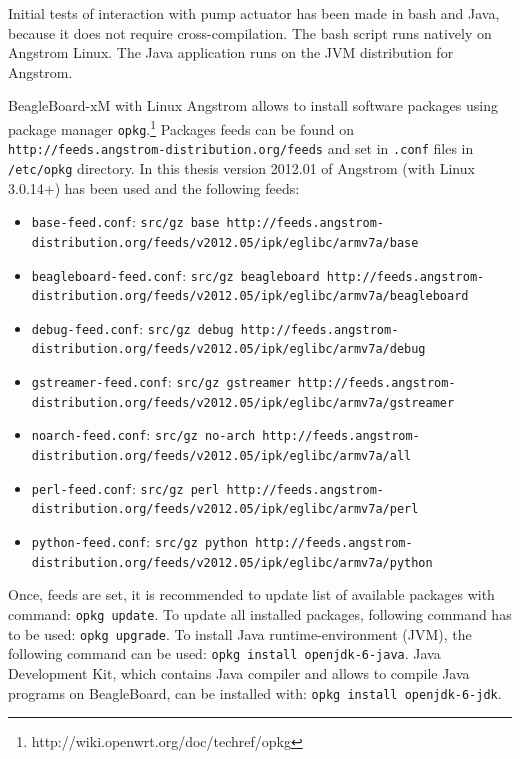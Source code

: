 Initial tests of interaction with pump actuator has been made in bash and Java, because it does not require cross-compilation. The bash script runs natively on Angstrom Linux. The Java application runs on the JVM distribution for Angstrom. 

\clearpage

BeagleBoard-xM with Linux Angstrom allows to install software packages using package manager \lstinline{opkg}.\footnote{http://wiki.openwrt.org/doc/techref/opkg} Packages feeds can be found on \lstinline{http://feeds.angstrom-distribution.org/feeds} and set in \lstinline{.conf} files in \lstinline{/etc/opkg} directory. In this thesis version 2012.01 of Angstrom (with Linux 3.0.14+) has been used and the following feeds:
\begin{itemize} \itemsep0pt \parskip0pt 
	\item \lstinline{base-feed.conf}: \lstinline{src/gz base http://feeds.angstrom-distribution.org/feeds/v2012.05/ipk/eglibc/armv7a/base}
	\item \lstinline{beagleboard-feed.conf}: \lstinline{src/gz beagleboard http://feeds.angstrom-distribution.org/feeds/v2012.05/ipk/eglibc/armv7a/beagleboard}
	\item \lstinline{debug-feed.conf}: \lstinline{src/gz debug http://feeds.angstrom-distribution.org/feeds/v2012.05/ipk/eglibc/armv7a/debug}
	\item \lstinline{gstreamer-feed.conf}: \lstinline{src/gz gstreamer http://feeds.angstrom-distribution.org/feeds/v2012.05/ipk/eglibc/armv7a/gstreamer}
	\item \lstinline{noarch-feed.conf}: \lstinline{src/gz no-arch http://feeds.angstrom-distribution.org/feeds/v2012.05/ipk/eglibc/armv7a/all}
	\item \lstinline{perl-feed.conf}: \lstinline{src/gz perl http://feeds.angstrom-distribution.org/feeds/v2012.05/ipk/eglibc/armv7a/perl}
	\item \lstinline{python-feed.conf}: \lstinline{src/gz python http://feeds.angstrom-distribution.org/feeds/v2012.05/ipk/eglibc/armv7a/python}
\end{itemize}

Once, feeds are set, it is recommended to update list of available packages with command: \lstinline{opkg update}. To update all installed packages, following command has to be used: \lstinline{opkg upgrade}. To install Java runtime-environment (JVM), the following command can be used: \lstinline{opkg install openjdk-6-java}. Java Development Kit, which contains Java compiler and allows to compile Java programs on BeagleBoard, can be installed with: \lstinline{opkg install openjdk-6-jdk}.

